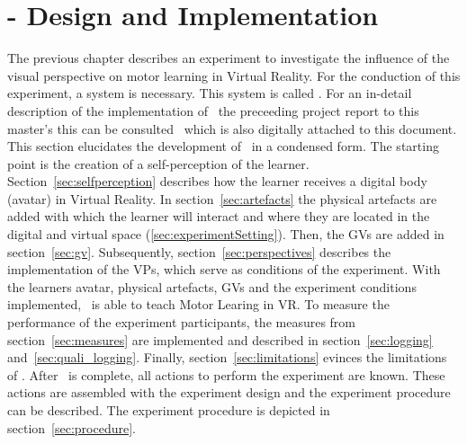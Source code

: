 \chapter{\exgo - Design and Implementation}
\label{chapter:system}
The previous chapter describes an experiment to investigate the influence of the visual perspective on motor learning in Virtual Reality. For the conduction of this experiment, a system is necessary. This system is called \exgo. For an in-detail description of the implementation of \exgo\ the preceeding project report to this master's this can be consulted~\cite{projectReport} which is also digitally attached to this document. This section elucidates the development of \exgo\ in a condensed form. The starting point is the creation of a self-perception of the learner. 
Section~\ref{sec:selfperception} describes how the learner receives a digital body (avatar) in Virtual Reality.
In section~\ref{sec:artefacts} the physical artefacts are added with which the learner will interact and where they are located in the digital and virtual space (\ref{sec:experimentSetting}). Then, the GVs are added in section~\ref{sec:gv}. Subsequently, section~\ref{sec:perspectives} describes the implementation of the VPs, which serve as conditions of the experiment. With the learners avatar, physical artefacts, GVs and the experiment conditions implemented, \exgo\ is able to teach Motor Learing in VR. To measure the performance of the experiment participants, the measures from section~\ref{sec:measures} are implemented and described in section~\ref{sec:logging} and~\ref{sec:quali_logging}. 
Finally, section~\ref{sec:limitations} evinces the limitations of \exgo.
After \exgo\ is complete, all actions to perform the experiment are known. These actions are assembled with the experiment design and the experiment procedure can be described. The experiment procedure is depicted in section~\ref{sec:procedure}.

